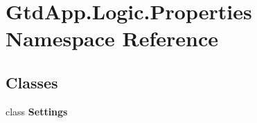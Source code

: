 \hypertarget{namespace_gtd_app_1_1_logic_1_1_properties}{}\section{Gtd\+App.\+Logic.\+Properties Namespace Reference}
\label{namespace_gtd_app_1_1_logic_1_1_properties}
\subsection*{Classes}
\begin{DoxyCompactItemize}
\item 
class {\bfseries Settings}
\end{DoxyCompactItemize}
